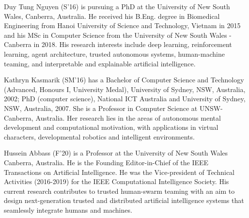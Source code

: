 \documentclass[lettersize,journal]{IEEEtran}
\begin{document}




\vspace{-1.5em}
\begin{IEEEbiography}{Duy Tung Nguyen} 
(S\textquoteright 16) is pursuing a PhD at the University of New South Wales, Canberra, Australia. He received his B.Eng. degree in Biomedical Engineering from Hanoi University of Science and Technology, Vietnam in 2015 and his MSc in Computer Science from the University of New South Wales - Canberra in 2018. His research interests include deep learning, reinforcement learning, agent architecture, trusted autonomous systems, human-machine teaming, and interpretable and explainable artificial intelligence.
\end{IEEEbiography}

\vspace{-1.5em}

\begin{IEEEbiography}{Kathryn Kasmarik}
(SM\textquoteright 16) has a Bachelor of Computer Science and Technology (Advanced, Honours I, University Medal), University of Sydney, NSW, Australia, 2002; PhD (computer science), National ICT Australia and University of Sydney, NSW, Australia, 2007. She is a Professor in Computer Science at UNSW-Canberra, Australia. Her research lies in the areas of autonomous mental development and computational motivation, with applications in virtual characters, developmental robotics and intelligent environments.
\end{IEEEbiography}

\vspace{-1.5em}

\begin{IEEEbiography}{Hussein Abbass}
(F\textquoteright 20) is a Professor at the University of New South Wales Canberra, Australia. He is the Founding Editor-in-Chief of the IEEE Transactions on Artificial Intelligence. He was the Vice-president of Technical
Activities (2016-2019) for the IEEE Computational Intelligence Society. His current research contributes to trusted human-swarm teaming with an aim to design next-generation trusted and distributed artificial intelligence systems that seamlessly integrate humans and machines.
\end{IEEEbiography}

\vfill
\end{document}

